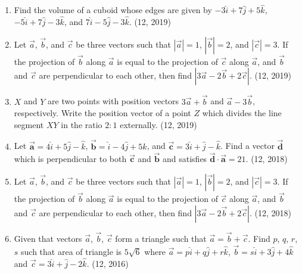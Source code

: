 \begin{enumerate}[label=\thesubsection.\arabic*,ref=\thesubsection.\theenumi]
	\item Find the volume of a cuboid whose edges are given by $-3\hat{i} + 7\hat{j} + 5\hat{k}$, $-5\hat{i} + 7\hat{j} - 3\hat{k}$, and $7\hat{i} - 5\hat{j} - 3\hat{k}$. \hfill (12, 2019)
	
	\item Let $\overrightarrow{a}$, $\overrightarrow{b}$, and $\overrightarrow{c}$ be three vectors such that $|\overrightarrow{a}| = 1$, $|\overrightarrow{b}| = 2$, and $|\overrightarrow{c}| = 3$. If the projection of $\overrightarrow{b}$ along $\overrightarrow{a}$ is equal to the projection of $\overrightarrow{c}$ along $\overrightarrow{a}$, and $\overrightarrow{b}$ and $\overrightarrow{c}$ are perpendicular to each other, then find $|3\overrightarrow{a} - 2\overrightarrow{b} + 2\overrightarrow{c}|$. \hfill (12, 2019)
	\item $X$ and $Y$ are two points with position vectors $3\overrightarrow{a} + \overrightarrow{b}$ and $\overrightarrow{a} - 3\overrightarrow{b}$, respectively. Write the position vector of a point $Z$ which divides the line segment $XY$ in the ratio $2:1$ externally. \hfill (12, 2019)
\item Let $\overrightarrow{\mathbf{a}} = 4\hat{i} + 5\hat{j} - \hat{k}$, $\overrightarrow{\mathbf{b}} = \hat{i} - 4\hat{j} + 5\hat{k}$, and $\overrightarrow{\mathbf{c}} = 3\hat{i} + \hat{j} - \hat{k}$. Find a vector $\overrightarrow{\mathbf{d}}$ which is perpendicular to both $\overrightarrow{\mathbf{c}}$ and $\overrightarrow{\mathbf{b}}$ and satisfies $\overrightarrow{\mathbf{d}} \cdot \overrightarrow{\mathbf{a}} = 21$. \hfill (12, 2018)
\item Let $\overrightarrow{a}$, $\overrightarrow{b}$, and $\overrightarrow{c}$ be three vectors such that $|\overrightarrow{a}| = 1$, $|\overrightarrow{b}| = 2$, and $|\overrightarrow{c}| = 3$. If the projection of $\overrightarrow{b}$ along $\overrightarrow{a}$ is equal to the projection of $\overrightarrow{c}$ along $\overrightarrow{a}$, and $\overrightarrow{b}$ and $\overrightarrow{c}$ are perpendicular to each other, then find $|3\overrightarrow{a} - 2\overrightarrow{b} + 2\overrightarrow{c}|$. \hfill (12, 2018)
\item Given that vectors $\overrightarrow{a}$, $\overrightarrow{b}$, $\overrightarrow{c}$ form a triangle such that
      $\overrightarrow{a} = \overrightarrow{b}+\overrightarrow{c}$. Find $p$, $q$, $r$, $s$ such that area of triangle is $5\sqrt{6}$ where $\overrightarrow{a} = p\hat{i} +q\hat{j}+r\hat{k}$,
      $\overrightarrow{b} = s\hat{i} +3\hat{j}+4\hat{k}$ and $\overrightarrow{c}=3\hat{i} +\hat{j}-2\hat{k}$. \hfill (12, 2016)

\end{enumerate}

